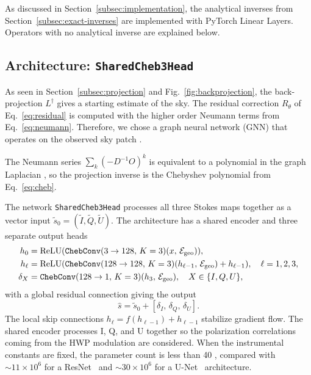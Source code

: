 \documentclass[a4paper,11pt]{article}
\begin{document}
As discussed in Section~\ref{subsec:implementation}, the analytical inverses from Section~\ref{subsec:exact-inverses} are implemented with PyTorch Linear Layers. Operators with no analytical inverse are explained below. 

\subsection{Architecture: \texttt{SharedCheb3Head}}
\label{subsec:net-arch}

As seen in Section~\ref{subsec:projection} and Fig.~\ref{fig:backprojection}, the back-projection $L^\dagger$ gives a starting estimate of the sky. The residual correction $R_\theta$ of Eq.~\ref{eq:residual} is computed with the higher order Neumann terms from Eq.~\ref{eq:neumann}. Therefore, we chose a graph neural
network (GNN) that operates on the observed sky patch 
\cite{scarselli2009gnn}.

The Neumann series $\sum_k (-D^{-1}O)^k$ is equivalent to a polynomial in the graph Laplacian
\cite{defferrard2016chebconv}, so the projection inverse is the Chebyshev polynomial from Eq.~\ref{eq:cheb}.

The network \texttt{SharedCheb3Head} processes all three Stokes maps together as a vector input $\tilde{s}_0 = (\tilde{I}, \tilde{Q}, \tilde{U}).$ The architecture has a shared encoder and three separate output heads
\begin{align}
    h_0 &= \text{ReLU}(\texttt{ChebConv}(3 \to 128,\, K=3)(x,\,
    \mathcal{E}_{\rm geo})), \\
    h_\ell &= \text{ReLU}(\texttt{ChebConv}(128 \to 128,\, K=3)
    (h_{\ell-1},\, \mathcal{E}_{\rm geo}) + h_{\ell-1}), \quad
    \ell = 1,2,3, \\
    \delta_X &= \texttt{ChebConv}(128 \to 1,\, K=3)(h_3,\,
    \mathcal{E}_{\rm geo}), \quad X \in \{I, Q, U\},
\end{align}
with a global residual connection giving the output
\begin{equation}
    \hat{s} = \tilde{s}_0 + [\delta_I,\, \delta_Q,\, \delta_U].
\end{equation}
The local skip connections $h_\ell = f(h_{\ell-1}) + h_{\ell-1}$ stabilize gradient flow. The shared encoder
processes I, Q, and U together so the polarization correlations coming from the HWP modulation are considered.  When the instrumental constants are fixed, the parameter count is less than 40 \cite{kardum2025proceeding}, compared with $\sim 11\times 10^6$ for a ResNet~\cite{he2016resnet} and $\sim 30\times 10^6$ for a U-Net~\cite{ronneberger2015unet} architecture.
\end{document}
